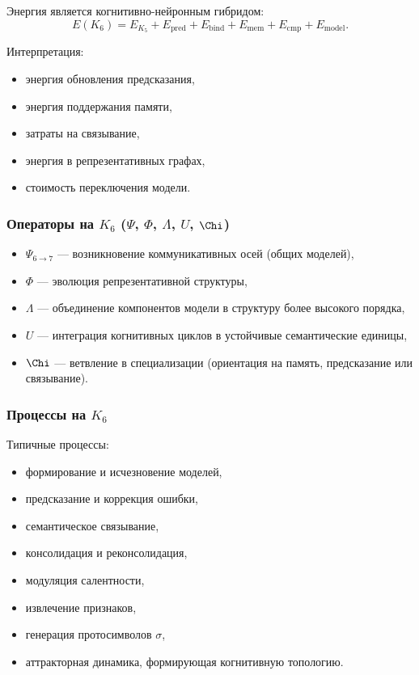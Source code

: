 Энергия является когнитивно-нейронным гибридом:
\[
E(K_6)
= E_{K_5}
+ E_{\mathrm{pred}}
+ E_{\mathrm{bind}}
+ E_{\mathrm{mem}}
+ E_{\mathrm{cmp}}
+ E_{\mathrm{model}}.
\]

Интерпретация:
\begin{itemize}
    \item энергия обновления предсказания,
    \item энергия поддержания памяти,
    \item затраты на связывание,
    \item энергия в репрезентативных графах,
    \item стоимость переключения модели.
\end{itemize}

\subsubsection{Операторы на \texorpdfstring{$K_6$}{K_6} (\texorpdfstring{$\Psi$}{\Psi}, \texorpdfstring{$\Phi$}{\Phi}, \texorpdfstring{$\Lambda$}{\Lambda}, \texorpdfstring{$U$}{U}, \texorpdfstring{$\Chi$}{\Chi})}

\begin{itemize}
    \item $\Psi_{6\to7}$ — возникновение коммуникативных осей (общих моделей),
    \item $\Phi$ — эволюция репрезентативной структуры,
    \item $\Lambda$ — объединение компонентов модели в структуру более
          высокого порядка,
    \item $U$ — интеграция когнитивных циклов в устойчивые семантические
          единицы,
    \item $\Chi$ — ветвление в специализации (ориентация на память,
          предсказание или связывание).
\end{itemize}

\subsubsection{Процессы на \texorpdfstring{$K_6$}{K_6}}

Типичные процессы:
\begin{itemize}
    \item формирование и исчезновение моделей,
    \item предсказание и коррекция ошибки,
    \item семантическое связывание,
    \item консолидация и реконсолидация,
    \item модуляция салентности,
    \item извлечение признаков,
    \item генерация протосимволов $\sigma$,
    \item аттракторная динамика, формирующая когнитивную топологию.
\end{itemize}

